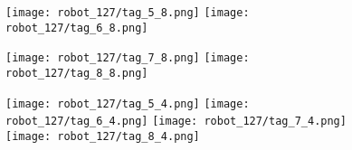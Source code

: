 \documentclass{article}
\begin{document}
\begin{figure}[h]
\texttt{[image: robot\_127/tag\_5\_8.png]} 
\texttt{[image: robot\_127/tag\_6\_8.png]} 


\texttt{[image: robot\_127/tag\_7\_8.png]} 
\texttt{[image: robot\_127/tag\_8\_8.png]} 


\texttt{[image: robot\_127/tag\_5\_4.png]} 
\texttt{[image: robot\_127/tag\_6\_4.png]} 
\texttt{[image: robot\_127/tag\_7\_4.png]} 
\texttt{[image: robot\_127/tag\_8\_4.png]} 

\end{figure}
\end{document}
